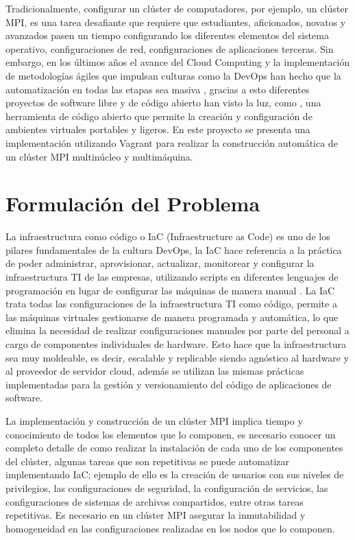 \documentclass[letterpaper, 12pt, oneside]{article}
\begin{document}
    Tradicionalmente, configurar un clúster de computadores, por ejemplo, un clúster MPI, es una tarea desafiante que requiere que estudiantes, aficionados, novatos y avanzados pasen un tiempo configurando los diferentes elementos del sistema operativo, configuraciones de red, configuraciones de aplicaciones terceras. Sin embargo, en los últimos años el avance del Cloud Computing y la implementación de metodologías ágiles que impulsan culturas como la DevOps han hecho que la automatización en todas las etapas sea masiva  \cite{devopsH2} \cite{devopsH3} , gracias a esto  diferentes proyectos de software libre y de código abierto han visto la luz, como , una herramienta de código abierto que permite la creación y configuración de ambientes virtuales portables y ligeros. En este proyecto se presenta una implementación utilizando Vagrant para realizar  la construcción automática de un clúster MPI multinúcleo y multimáquina.
    
    \section{Formulación del Problema}
    
    La infraestructura como código o IaC (Infraestructure as Code) es uno de los pilares fundamentales de la cultura DevOps, la IaC hace referencia a la práctica de poder administrar, aprovisionar, actualizar, monitorear y configurar la infraestructura TI de las empresas, utilizando scripts en diferentes lenguajes de programación en lugar de configurar las máquinas de manera manual\cite{devopsH4} \cite{iac}. La IaC trata todas las configuraciones de la infraestructura TI como código, permite a las máquinas virtuales gestionarse de manera programada y automática, lo que elimina la necesidad de realizar configuraciones manuales por parte del personal a cargo de componentes individuales de hardware. Esto hace que la infraestructura sea muy moldeable, es decir, escalable y replicable siendo agnóstico al hardware y al proveedor de servidor cloud, además se utilizan las mismas prácticas implementadas para la gestión y versionamiento del código de aplicaciones de software. 

    La implementación y construcción de un clúster MPI implica  tiempo y conocimiento de todos los elementos que lo componen, es necesario conocer un completo detalle de como realizar la instalación de cada uno de los componentes del clúster, algunas tareas que son repetitivas se puede automatizar implementando IaC; ejemplo de ello es la creación de usuarios con sus niveles de privilegios, las configuraciones de seguridad, la configuración de servicios, las configuraciones de sistemas de archivos compartidos, entre otras tareas repetitivas. Es necesario en un clúster MPI asegurar la inmutabilidad y homogeneidad en las configuraciones realizadas en los nodos que lo componen.\cite{repositoriounal}
    \clearpage
    
\end{document}
